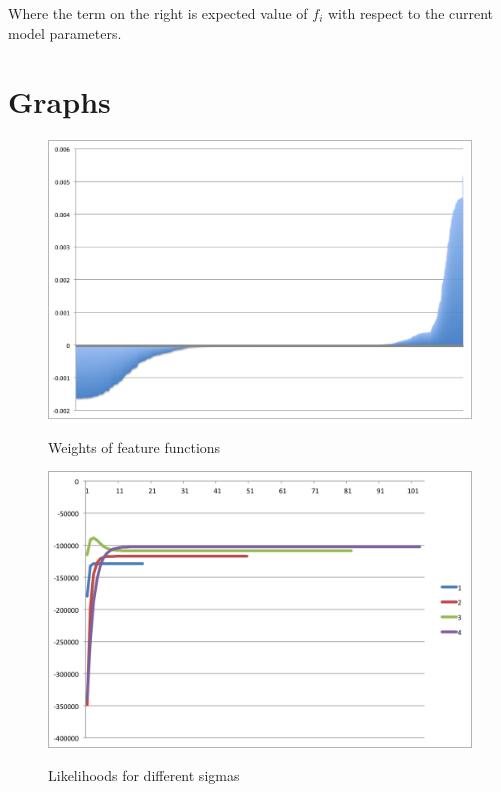 \documentclass[12pt, letterpaper]{article}
\begin{document}
Where the term on the right is expected value of $f_i$ with respect to the current model parameters.

\section {Graphs}

        \begin{figure}[ht]
            \center
            \caption{Weights of feature functions}
            \includegraphics[scale=0.5]{ml_weights}\\
        \end{figure}

        \begin{figure}[ht]
            \center
            \caption{Likelihoods for different sigmas}
            \includegraphics[scale=0.5]{ml_likelihood}\\
        \end{figure}
\end{document}
